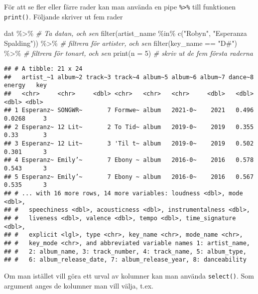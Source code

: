 \documentclass[
]{book}
\newenvironment{Shaded}{\begin{snugshade}}{\end{snugshade}}
\newcommand{\AttributeTok}[1]{\textcolor[rgb]{0.77,0.63,0.00}{#1}}
\newcommand{\CommentTok}[1]{\textcolor[rgb]{0.56,0.35,0.01}{\textit{#1}}}
\newcommand{\DecValTok}[1]{\textcolor[rgb]{0.00,0.00,0.81}{#1}}
\newcommand{\FunctionTok}[1]{\textcolor[rgb]{0.00,0.00,0.00}{#1}}
\newcommand{\NormalTok}[1]{#1}
\newcommand{\SpecialCharTok}[1]{\textcolor[rgb]{0.00,0.00,0.00}{#1}}
\newcommand{\StringTok}[1]{\textcolor[rgb]{0.31,0.60,0.02}{#1}}
\theoremstyle{definition}
\theoremstyle{definition}
\theoremstyle{definition}
\theoremstyle{definition}
\theoremstyle{remark}
\begin{document}
För att se fler eller färre rader kan man använda en pipe \texttt{\%\textgreater{}\%} till funktionen \texttt{print()}. Följande skriver ut fem rader

\begin{Shaded}
\begin{Highlighting}[]
\NormalTok{dat }\SpecialCharTok{\%\textgreater{}\%}                                                              \CommentTok{\# Ta datan, och sen}
  \FunctionTok{filter}\NormalTok{(artist\_name }\SpecialCharTok{\%in\%} \FunctionTok{c}\NormalTok{(}\StringTok{"Robyn"}\NormalTok{, }\StringTok{"Esperanza Spalding"}\NormalTok{)) }\SpecialCharTok{\%\textgreater{}\%}      \CommentTok{\# filtrera för artister, och sen}
  \FunctionTok{filter}\NormalTok{(key\_name }\SpecialCharTok{==} \StringTok{"D\#"}\NormalTok{)  }\SpecialCharTok{\%\textgreater{}\%}                                      \CommentTok{\# filtrera för tonart, och sen}
  \FunctionTok{print}\NormalTok{(}\AttributeTok{n =} \DecValTok{5}\NormalTok{)                                                       }\CommentTok{\# skriv ut de fem första raderna}
\end{Highlighting}
\end{Shaded}

\begin{verbatim}
## # A tibble: 21 x 24
##   artist_~1 album~2 track~3 track~4 album~5 album~6 album~7 dance~8 energy   key
##   <chr>     <chr>     <dbl> <chr>   <chr>   <chr>     <dbl>   <dbl>  <dbl> <dbl>
## 1 Esperanz~ SONGWR~       7 Formwe~ album   2021-0~    2021   0.496 0.0268     3
## 2 Esperanz~ 12 Lit~       2 To Tid~ album   2019-0~    2019   0.355 0.33       3
## 3 Esperanz~ 12 Lit~       3 'Til t~ album   2019-0~    2019   0.502 0.301      3
## 4 Esperanz~ Emily’~       7 Ebony ~ album   2016-0~    2016   0.578 0.543      3
## 5 Esperanz~ Emily’~       7 Ebony ~ album   2016-0~    2016   0.567 0.535      3
## # ... with 16 more rows, 14 more variables: loudness <dbl>, mode <dbl>,
## #   speechiness <dbl>, acousticness <dbl>, instrumentalness <dbl>,
## #   liveness <dbl>, valence <dbl>, tempo <dbl>, time_signature <dbl>,
## #   explicit <lgl>, type <chr>, key_name <chr>, mode_name <chr>,
## #   key_mode <chr>, and abbreviated variable names 1: artist_name,
## #   2: album_name, 3: track_number, 4: track_name, 5: album_type,
## #   6: album_release_date, 7: album_release_year, 8: danceability
\end{verbatim}

Om man istället vill göra ett urval av kolumner kan man använda \texttt{select()}. Som argument anges de kolumner man vill välja, t.ex.
\end{document}
